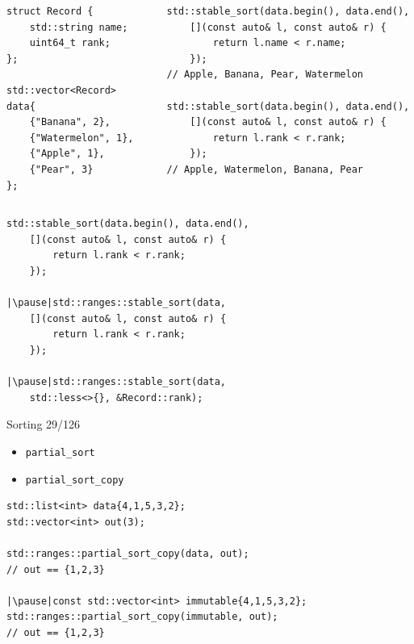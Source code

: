 \documentclass[aspectratio=169]{beamer}
\begin{document}
\begin{frame}[fragile]{}
\begin{columns}
\begin{column}{0.4\textwidth}
\begin{verbatim}
struct Record {
    std::string name;
    uint64_t rank;
};

std::vector<Record> data{
    {"Banana", 2},
    {"Watermelon", 1},
    {"Apple", 1},
    {"Pear", 3}
};
\end{verbatim}
\end{column}
\pause
\vrule{}
\begin{column}{0.6\textwidth}
\begin{verbatim}
std::stable_sort(data.begin(), data.end(), 
    [](const auto& l, const auto& r) {
        return l.name < r.name;
    });
// Apple, Banana, Pear, Watermelon

std::stable_sort(data.begin(), data.end(), 
    [](const auto& l, const auto& r) {
        return l.rank < r.rank;
    });
// Apple, Watermelon, Banana, Pear
\end{verbatim}
\end{column}
\end{columns}
\end{frame}

\begin{frame}[fragile]{}
\begin{verbatim}
std::stable_sort(data.begin(), data.end(), 
    [](const auto& l, const auto& r) {
        return l.rank < r.rank;
    });

|\pause|std::ranges::stable_sort(data, 
    [](const auto& l, const auto& r) {
        return l.rank < r.rank;
    });

|\pause|std::ranges::stable_sort(data,
    std::less<>{}, &Record::rank);
\end{verbatim}
\end{frame}

\begin{frame}{Sorting 29/126}
  \begin{itemize}
    \item{\texttt{partial_sort}}
    \item{\texttt{partial_sort_copy}}
  \end{itemize}
\end{frame}

\begin{frame}[fragile]{}
\begin{verbatim}
std::list<int> data{4,1,5,3,2};
std::vector<int> out(3);

std::ranges::partial_sort_copy(data, out);
// out == {1,2,3}

|\pause|const std::vector<int> immutable{4,1,5,3,2};
std::ranges::partial_sort_copy(immutable, out);
// out == {1,2,3}
\end{verbatim}
\end{frame}
\end{document}
